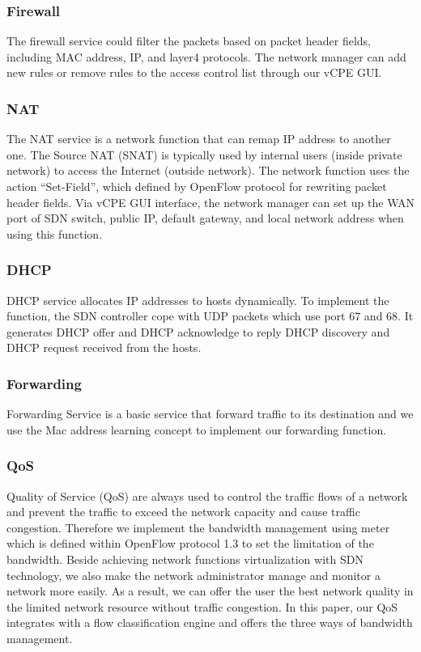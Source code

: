 \documentclass[journal]{IEEEtran}
\begin{document}
\subsubsection{Firewall}
The firewall service could filter the packets based on packet header fields, including MAC address, IP, and layer4 protocols. The network manager can add new rules or remove rules to the access control list through our vCPE GUI.

\subsubsection{NAT}
The NAT service is a network function that can remap  IP address to another one. The Source NAT (SNAT) is typically used by internal users (inside private network) to access the Internet (outside network). The network function uses the action “Set-Field”, which defined by OpenFlow protocol for rewriting packet header fields. Via vCPE GUI interface, the network manager can set up the WAN port of SDN switch, public IP, default gateway, and local network address when using this function.

\subsubsection{DHCP}
DHCP service allocates IP addresses to hosts dynamically. To implement the function, the SDN controller cope with UDP packets which use port 67 and 68. It generates DHCP offer and DHCP acknowledge to reply DHCP discovery and DHCP request received from the hosts.

\subsubsection{Forwarding}
Forwarding Service is a basic service that forward traffic to its destination and we use the Mac address learning concept to implement our forwarding function.

\subsubsection{QoS}
Quality of Service (QoS) are always used to control the traffic flows of a network and prevent the traffic to exceed the network capacity and cause traffic congestion. Therefore we implement the bandwidth management using meter which is defined within OpenFlow protocol 1.3 to set the limitation of the bandwidth.
Beside achieving network functions virtualization with SDN technology, we also make the network administrator manage and monitor a network more easily. As a result, we can offer the user the best network quality in the limited network resource without traffic congestion.
In this paper, our QoS integrates with a flow classification engine and offers the three ways of bandwidth management.
\end{document}
